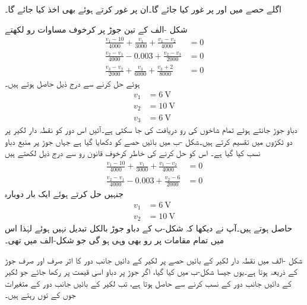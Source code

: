 اگلے حصے میں  اور  پر غور کیا جائے گا۔ان پر غور کرتے ہوئے  بھی اخذ کیا جائے گا۔

شکل -الف  کے تین جوڑ پر کرخوف مساوات رو لکھتے
\begin{align*}
\frac{v_1-10}{4000}+\frac{v_1}{3000}+\frac{v_1-v_2}{4000}&=0\\
\frac{v_2-v_1}{4000}-0.003+\frac{v_2-v_3}{2000}&=0\\
\frac{v_3-v_2}{2000}+\frac{v_3}{6000}+\frac{v_3+2}{8000}&=0
\end{align*}
ہوئے حل کرنے سے درج ذیل حاصل ہوتے ہیں۔
\begin{align*}
v_1&=\SI{6}{\volt}\\
v_2&=\SI{10}{\volt}\\
v_3&=\SI{6}{\volt}
\end{align*}
دباو جوڑ جانتے ہوئے تمام شاخوں کی رو دریافت کی جا سکتی ہے۔آئیں اس دور کو نقطہ دار لکیر پر دو ٹکڑوں میں تقسیم کرتے ہیں۔شکل -ب میں بائیں حصے کو دکھایا گیا ہے جہاں جوڑ  پر  منبع دباو نسب کیا گیا ہے۔ اس کو حل کرنے کی خاطر کرخوف قانون رو سے درج ذیل لکھتے ہیں
\begin{align*}
\frac{v_1-10}{4000}+\frac{v_1}{3000}+\frac{v_1-v_2}{4000}&=0\\
\frac{v_2-v_1}{4000}-0.003+\frac{v_2-6}{2000}&=0
\end{align*}
جنہیں حل کرتے ہوئے ایک بار دوبارہ
\begin{align*}
v_1&=\SI{6}{\volt}\\
v_2&=\SI{10}{\volt}
\end{align*}
حاصل ہوتے ہیں۔آپ نے دیکھا کہ شکل-ب کے  دباو جوڑ بالکل تبدیل نہیں ہوئے لہٰذا اس میں تمام مقامات پر رو بھی وہی ہو گی جو شکل-الف میں تھی۔

شکل -الف میں نقطہ دار لکیر کے بائیں حصے پر لکیر کے دائیں جانب دور کا اثر صرف اور صرف جوڑ  کے ذریعہ ہوتا ہے۔یوں جیسا شکل-ب میں کیا گیا، اگر جوڑ  پر دباو اسی قیمت پر رکھا جائے جو لکیر کے دائیں جانب دور کے نسب کرنے سے حاصل ہوتا ہے، تب  لکیر کے بائیں جانب دور کے متغیرات جوں کے توں رہتے ہیں۔  

